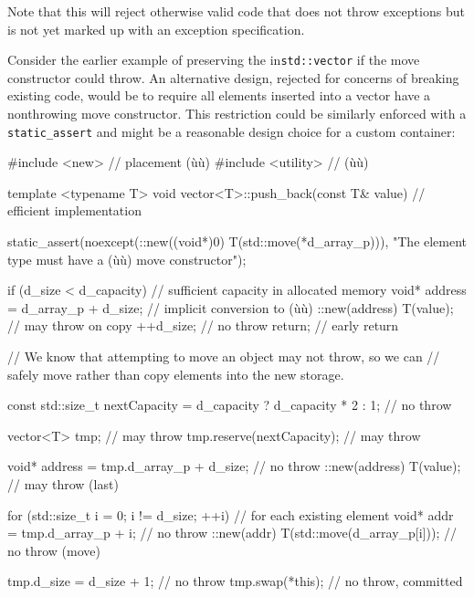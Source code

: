 \noindent Note that this will reject otherwise valid code that does not throw
exceptions but is not yet marked up with an exception specification.

Consider the earlier example of preserving the  in\linebreak[4] \lstinline!std::vector! if the move
constructor could throw. An alternative design, rejected for concerns of
breaking existing code, would be to require all elements inserted into a
vector have a nonthrowing move constructor. This restriction could be
similarly enforced with a \lstinline!static_assert! and might be a
reasonable design choice for a custom container:

\begin{emcppslisting}[emcppsbatch=e17]
#include <new>      // placement (ù{}ù)
#include <utility>  // (ù{}ù)

template <typename T>
void vector<T>::push_back(const T& value)  // efficient implementation
{
    static_assert(noexcept(::new((void*)0) T(std::move(*d_array_p))),
                 "The element type must have a (ù{}ù) move constructor");

    if (d_size < d_capacity)  // sufficient capacity in allocated memory
    {
        void* address = d_array_p + d_size;  // implicit conversion to (ù{}ù)
        ::new(address) T(value);             // may throw on copy
        ++d_size;                            // no throw
        return;                              // early return
    }

    // We know that attempting to move an object may not throw, so we can
    // safely move rather than copy elements into the new storage.

    const std::size_t nextCapacity = d_capacity ? d_capacity * 2
                                                : 1;              // no throw

    vector<T> tmp;                                  // may throw
    tmp.reserve(nextCapacity);                   // may throw

    void* address = tmp.d_array_p + d_size;      // no throw
    ::new(address) T(value);                     // may throw (last)

    for (std::size_t i = 0; i != d_size; ++i)    // for each existing element
    {
        void* addr = tmp.d_array_p + i;          // no throw
        ::new(addr) T(std::move(d_array_p[i]));  // no throw (move)
    }

    tmp.d_size = d_size + 1;  // no throw
    tmp.swap(*this);          // no throw, committed
}
\end{emcppslisting}
    

